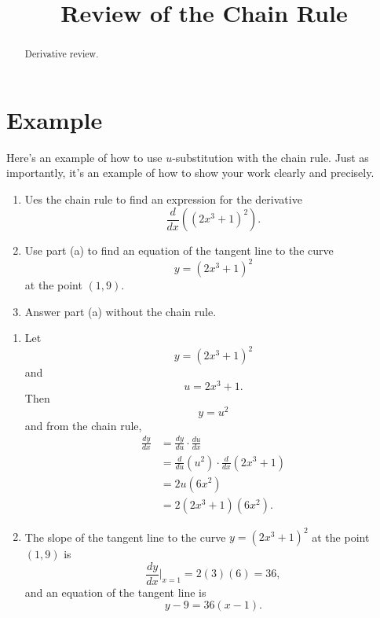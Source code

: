 \documentclass{ximera}
\title{Review of the Chain Rule}
\begin{document}
\begin{abstract}
Derivative review.
\end{abstract}
\maketitle


\section{Example}

Here's an example of how to use $u$-substitution with the chain rule. Just as importantly, it's an example of how to show your work clearly and precisely.

\begin{example}  \label{Ex:GdfeerDFGff}
\begin{enumerate}
\item Ues the chain rule to find an expression for the derivative
\[
  \frac{d}{dx} \left(   (2x^3+1)^2 \right).
\]

\item Use part (a) to find an equation of the tangent line to the curve
\[
        y = (2x^3+1)^2
\]
at the point $(1,9)$.

\item Answer part (a) without the chain rule.

\end{enumerate}

\begin{explanation}
\begin{enumerate}
\item Let 
\[
       y = \left( 2x^3 +1  \right)^2
\]
and 
\[
      u = 2x^3 + 1 .
\]
Then
\[
     y = u^2
\]
and from the chain rule,
\begin{align*}
\frac{dy}{dx} &= \frac{dy}{du} \cdot \frac{du}{dx}  \\
                     &= \frac{d}{du} \left( u^2 \right)  \cdot \frac{d}{dx}\left(  2x^3 + 1 \right)  \\
                     &= 2u (6x^2)  \\
                     &= 2(2x^3+1)(6x^2) .
\end{align*}

\item The slope of the tangent line to the curve $y=(2x^3+1)^2$ at the point $(1,9)$ is 
\[
              \frac{dy}{dx}\Big|_{x=1} = 2(3)(6) = 36 ,
\]
and an equation of the tangent line is
\[
   y - 9 = 36(x-1) .
\]


\end{enumerate}
\end{explanation}
\end{example}
\end{document}
